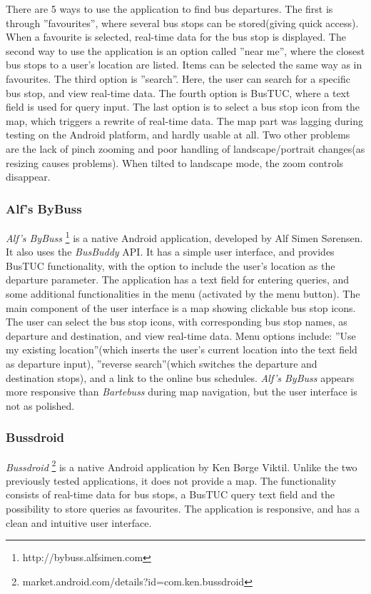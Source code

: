 \setlength{\intextsep}{3pt}
There are 5 ways to use the application to find bus departures. The first is through ''favourites'', where several bus stops can be stored(giving quick access). When a favourite is selected, real-time data for the bus stop is displayed. The second way to use the application is an option called ''near me'', where the closest bus stops to a user's location are listed. Items can be selected the same way as in favourites. The third option is ''search''. Here, the user can search for a specific bus stop, and view real-time data. The fourth option is BusTUC, where a text field is used for query input. The last option is to select a bus stop icon from the map, which triggers a rewrite of real-time data. The map part was lagging during testing on the Android platform, and hardly usable at all. Two other problems are the lack of pinch zooming and poor handling of landscape/portrait changes(as resizing causes problems). When tilted to landscape mode, the zoom controls disappear.

\subsubsection{Alf's ByBuss}
\emph{Alf's ByBuss} \footnote{http://bybuss.alfsimen.com} is a native Android application, developed by Alf Simen S\o rensen. It also uses the \emph{BusBuddy} API. It has a simple user interface, and provides BusTUC functionality, with the option to include the user's location as the departure parameter.
The application has a text field for entering queries, and some additional functionalities in the menu (activated by the menu button). The main component of the user interface is a map showing clickable bus stop icons. The user can select the bus stop icons, with corresponding bus stop names, as departure and destination, and view real-time data. Menu options include: ''Use my existing location''(which inserts the user's current location into the text field as departure input), ''reverse search''(which switches the departure and destination stops), and a link to the online bus schedules. \emph{Alf's ByBuss} appears more responsive than \emph{Bartebuss} during map navigation, but the user interface is not as polished. 
\subsubsection{Bussdroid}
\emph{Bussdroid} \footnote{market.android.com/details?id=com.ken.bussdroid} is a native Android application by Ken B\o rge Viktil. Unlike the two previously tested applications, it does not provide a map. The functionality consists of real-time data for bus stops, a BusTUC query text field and the possibility to store queries as favourites. The application is responsive, and has a clean and intuitive user interface. 


